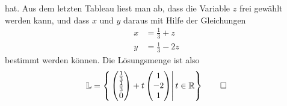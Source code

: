 \begin{loesung}
hat.
Aus dem letzten Tableau liest man ab, dass die Variable $z$ frei gewählt
werden kann, und dass $x$ und $y$ daraus mit Hilfe der Gleichungen
\begin{align*}
x&=\frac13+z\\
y&=\frac13-2z
\end{align*}
bestimmt werden können.
Die Lösungsmenge ist also
\[
\mathbb L =\left\{\left.
\begin{pmatrix}\frac13\\\frac13\\0\end{pmatrix}
+
t\begin{pmatrix}1\\-2\\1\end{pmatrix}
\right| t\in\mathbb R
\right\}
\qedhere
\]
\end{loesung}

